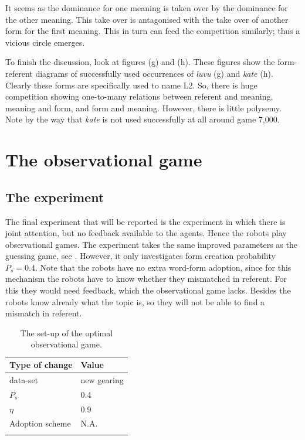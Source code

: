 It seems as the dominance for one meaning is taken over by the dominance for the other meaning. This take over is antagonised with the take over of another form for the first meaning. This in turn can feed the competition similarly; thus a vicious circle emerges.


To finish the discussion, look at figures (g) and (h). These figures show the form-referent diagrams of successfully used occurrences of {\it luvu} (g) and {\it kate} (h). Clearly these forms are specifically used to name L2. So, there is huge competition showing one-to-many relations between referent and meaning, meaning and form, and form and meaning. However, there is little polysemy. Note by the way that {\it kate} is not used successfully at all around game 7,000.


\section{The observational game}\label{s:opt:oli}

\subsection{The experiment}

The final experiment that will be reported is the experiment in which there is joint attention, but no feedback available to the agents. Hence the robots play observational games. The experiment takes the same improved parameters as the guessing game, see . However, it only investigates form creation probability $P_s=0.4$. Note that the robots have no extra word-form adoption, since for this mechanism the robots have to know whether they mismatched in referent. For this they would need feedback, which the observational game lacks. Besides the robots know already what the topic is, so they will not be able to find a mismatch in referent.

\begin{table}[t]
\centering
\begin{tabular}{ll}
\lsptoprule
Type of change & Value\\\midrule
data-set & new gearing\\%
$P_s$ & 0.4\\%
$\eta$ & 0.9\\%
Adoption scheme & N.A.\\%
\lspbottomrule
\end{tabular}
\caption{The set-up of the optimal observational game. }
\label{t:opt:oli}
\end{table}

